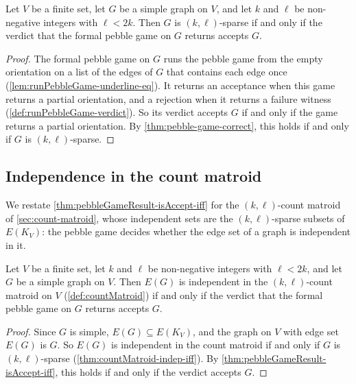 \begin{theorem}
  \label{thm:pebbleGameResult-isAccept-iff}
  \leanok
  Let $V$ be a finite set, let $G$ be a simple graph on $V$, and let $k$
  and $\ell$ be non-negative integers with $\ell < 2k$. Then $G$ is
  $(k, \ell)$-sparse if and only if the verdict that the formal pebble
  game on $G$ returns accepts $G$.
\end{theorem}
\begin{proof}
  \leanok
  The formal pebble game on $G$ runs the pebble game from the empty
  orientation on a list of the edges of $G$ that contains each edge
  once (\cref{lem:runPebbleGame-underline-eq}). It returns an
  acceptance when this game returns a partial orientation, and a
  rejection when it returns a failure witness
  (\cref{def:runPebbleGame-verdict}). So its verdict accepts $G$ if and
  only if the game returns a partial orientation. By
  \cref{thm:pebble-game-correct}, this holds if and only if $G$ is
  $(k, \ell)$-sparse.
\end{proof}

\subsection{Independence in the count matroid}
\label{sec:pebble-game-matroid}

We restate \cref{thm:pebbleGameResult-isAccept-iff} for the
$(k, \ell)$-count matroid of \cref{sec:count-matroid}, whose independent
sets are the $(k, \ell)$-sparse subsets of $E(K_V)$: the pebble game
decides whether the edge set of a graph is independent in it.

\begin{corollary}
  \label{cor:pebble-game-countMatroid-indep}
  \leanok
  Let $V$ be a finite set, let $k$ and $\ell$ be non-negative integers
  with $\ell < 2k$, and let $G$ be a simple graph on $V$. Then $E(G)$ is
  independent in the $(k, \ell)$-count matroid on $V$
  (\cref{def:countMatroid}) if and only if the verdict that the formal
  pebble game on $G$ returns accepts $G$.
\end{corollary}
\begin{proof}
  \leanok
  Since $G$ is simple, $E(G) \subseteq E(K_V)$, and the graph on $V$
  with edge set $E(G)$ is $G$. So $E(G)$ is independent in the count
  matroid if and only if $G$ is $(k, \ell)$-sparse
  (\cref{thm:countMatroid-indep-iff}). By
  \cref{thm:pebbleGameResult-isAccept-iff}, this holds if and only if
  the verdict accepts $G$.
\end{proof}

